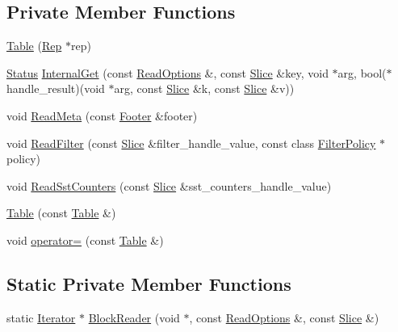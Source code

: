 \subsection*{Private Member Functions}
\begin{DoxyCompactItemize}
\item 
\hyperlink{classleveldb_1_1_table_a145d0ed70dfb8cb92956bb554db222e5}{Table} (\hyperlink{structleveldb_1_1_table_1_1_rep}{Rep} $\ast$rep)
\item 
\hyperlink{classleveldb_1_1_status}{Status} \hyperlink{classleveldb_1_1_table_a03a0be99e08b1fd316794e11677dab27}{Internal\+Get} (const \hyperlink{structleveldb_1_1_read_options}{Read\+Options} \&, const \hyperlink{classleveldb_1_1_slice}{Slice} \&key, void $\ast$arg, bool($\ast$handle\+\_\+result)(void $\ast$arg, const \hyperlink{classleveldb_1_1_slice}{Slice} \&k, const \hyperlink{classleveldb_1_1_slice}{Slice} \&v))
\item 
void \hyperlink{classleveldb_1_1_table_ac7b765e08d8285b2019e1faa6905368e}{Read\+Meta} (const \hyperlink{classleveldb_1_1_footer}{Footer} \&footer)
\item 
void \hyperlink{classleveldb_1_1_table_a10d0ee696719be3f9f66506751656175}{Read\+Filter} (const \hyperlink{classleveldb_1_1_slice}{Slice} \&filter\+\_\+handle\+\_\+value, const class \hyperlink{classleveldb_1_1_filter_policy}{Filter\+Policy} $\ast$policy)
\item 
void \hyperlink{classleveldb_1_1_table_aaecf590bce0acf005e9b21fb2d3e41d9}{Read\+Sst\+Counters} (const \hyperlink{classleveldb_1_1_slice}{Slice} \&sst\+\_\+counters\+\_\+handle\+\_\+value)
\item 
\hyperlink{classleveldb_1_1_table_ae65d769b917c37227f66221dbd3fe850}{Table} (const \hyperlink{classleveldb_1_1_table}{Table} \&)
\item 
void \hyperlink{classleveldb_1_1_table_a859ec9ca8d2745df17559b0613ac9cba}{operator=} (const \hyperlink{classleveldb_1_1_table}{Table} \&)
\end{DoxyCompactItemize}
\subsection*{Static Private Member Functions}
\begin{DoxyCompactItemize}
\item 
static \hyperlink{classleveldb_1_1_iterator}{Iterator} $\ast$ \hyperlink{classleveldb_1_1_table_a93b3e7e277493cbc63a55e2b141b1f30}{Block\+Reader} (void $\ast$, const \hyperlink{structleveldb_1_1_read_options}{Read\+Options} \&, const \hyperlink{classleveldb_1_1_slice}{Slice} \&)
\end{DoxyCompactItemize}

